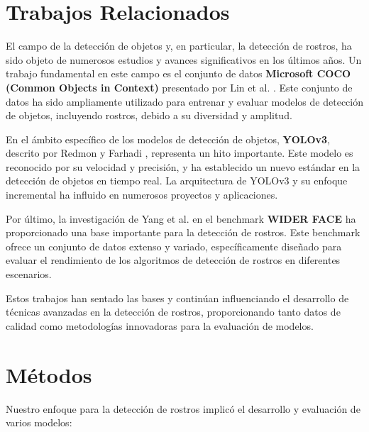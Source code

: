 \documentclass[10pt,twocolumn,letterpaper]{article}
\begin{document}
\section{Trabajos Relacionados}

El campo de la detección de objetos y, en particular, la detección de rostros, ha sido objeto de numerosos estudios y avances significativos en los últimos años. Un trabajo fundamental en este campo es el conjunto de datos \textbf{Microsoft COCO (Common Objects in Context)}
presentado por Lin et al. \cite{lin2015microsoft}. Este conjunto de datos ha sido ampliamente utilizado para entrenar y evaluar modelos de detección de objetos, incluyendo rostros, debido a su diversidad y amplitud.

En el ámbito específico de los modelos de detección de objetos, \textbf{YOLOv3}, descrito por Redmon y Farhadi \cite{redmon2018yolov3}, representa un hito importante. Este modelo es reconocido por su velocidad y precisión, y ha establecido un nuevo estándar en la detección de objetos en tiempo 
real. La arquitectura de YOLOv3 y su enfoque incremental ha influido en numerosos proyectos y aplicaciones.

Por último, la investigación de Yang et al. \cite{yang2016wider} en el benchmark \textbf{WIDER FACE} ha proporcionado una base importante para la detección de rostros. Este benchmark ofrece un conjunto de datos extenso y variado, específicamente diseñado para evaluar el rendimiento de los 
algoritmos de detección de rostros en diferentes escenarios.

Estos trabajos han sentado las bases y continúan influenciando el desarrollo de técnicas avanzadas en la detección de rostros, proporcionando tanto datos de calidad como metodologías innovadoras para la evaluación de modelos.

\section{Métodos}
\label{sec:metodos}

Nuestro enfoque para la detección de rostros implicó el desarrollo y evaluación de varios modelos:
\end{document}
